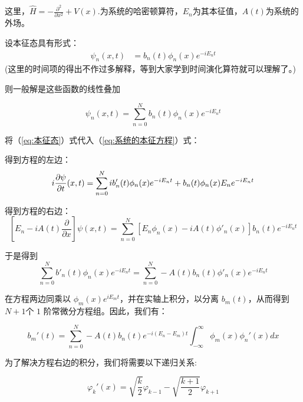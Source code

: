 \documentclass[12pt]{ctexart}
\numberwithin{equation}{section} %
\begin{document}
这里，$\hat{H}=-\frac{\partial^{2}}{\partial x^{2}}+V(x).$为系统的哈密顿算符，$E_n$为其本征值，$A(t)$为系统的外场。
     
设本征态具有形式：
\begin{align}
 \psi_n(x,t) &= b_n(t)\phi_n(x)e^{-iE_nt}
\end{align}
(这里的时间项的得出不作过多解释，等到大家学到时间演化算符就可以理解了。)
 
则一般解是这些函数的线性叠加


     \begin{equation}
    \psi_n(x,t)=\sum_{n=0}^Nb_n(t)\phi_n(x)e^{-iE_nt}
    \label{eq:本征态}
     \end{equation}

     将（\ref{eq:本征态}）式代入（\ref{eq:系统的本征方程}）式：
   
   得到方程的左边：
\begin{equation}
        i\frac{\partial\psi}{\partial t}(x,t) = \sum_{n=0}^{N}i b'_n(t)\phi_n(x)e^{-iE_nt} + b_n(t)\phi_n(x)E_ne^{-iE_nt} \\
       \end{equation}

    得到方程的右边：
    \begin{equation}
        \left[E_n-iA(t)\dfrac{\partial}{\partial x}\right]\psi(x,t)= \sum_{n=0}^{N}\left[E_n\phi_n(x)-iA(t)\phi'_n(x)\right]b_n(t)e^{-iE_nt}
    \end{equation}
   
    于是得到
    \begin{equation}
        \sum_{n=0}^{N}b'_n(t)\phi_n(x)e^{-iE_nt} = \sum_{n=0}^{N}-A(t)b_n(t)\phi'_n(x)e^{-iE_nt}
    \end{equation}


  在方程两边同乘以 \( \phi_m(x)e^{iE_mt} \)，并在实轴上积分，以分离 \( b_{m}(t) \)，从而得到$N+1$个 \( 1 \) 阶常微分方程组。因此，我们有：



  \begin{equation}  
  b_m'(t)=\sum_{n=0}^N-A(t)b_n(t)e^{-i(E_n-E_m)t}\int_{-\infty}^\infty\phi_m(x)\phi_n'(x)dx
  \label{eq:略略略}
\end{equation}  

  为了解决方程右边的积分，我们将需要以下递归关系:

\begin{equation}
        \varphi_k'(x)=\sqrt{\frac{k}{2}}\varphi_{k-1}-\sqrt{\frac{k+1}{2}}\varphi_{k+1}
    \end{equation}
\end{document}
